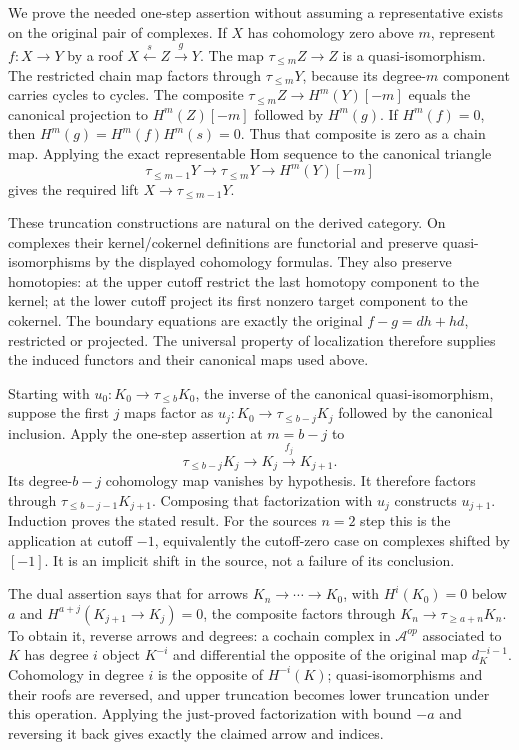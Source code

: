 We prove the needed one-step assertion without assuming a representative exists on the original pair of complexes. If \(X\) has cohomology zero above \(m\),\allowbreak{} represent \(f:X\to Y\) by a roof \(X\xleftarrow{s}Z\xrightarrow{g}Y\). The map \(\tau_{\leq m}Z\to Z\) is a quasi-isomorphism. The restricted chain map factors through \(\tau_{\leq m}Y\),\allowbreak{} because its degree-\(m\) component carries cycles to cycles. The composite \(\tau_{\leq m}Z\to H^m(Y)[-m]\) equals the canonical projection to \(H^m(Z)[-m]\) followed by \(H^m(g)\). If \(H^m(f)=0\),\allowbreak{} then \(H^m(g)=H^m(f)H^m(s)=0\). Thus that composite is zero as a chain map. Applying the exact representable Hom sequence to the canonical triangle \[
\tau_{\leq m-1}Y\to\tau_{\leq m}Y\to H^m(Y)[-m]
\] gives the required lift \(X\to\tau_{\leq m-1}Y\).

These truncation constructions are natural on the derived category. On complexes their kernel/\allowbreak{}cokernel definitions are functorial and preserve quasi-isomorphisms by the displayed cohomology formulas. They also preserve homotopies:\allowbreak{} at the upper cutoff restrict the last homotopy component to the kernel; at the lower cutoff project its first nonzero target component to the cokernel. The boundary equations are exactly the original \(f-g=dh+hd\),\allowbreak{} restricted or projected. The universal property of localization therefore supplies the induced functors and their canonical maps used above.

Starting with \(u_0:K_0\to\tau_{\leq b}K_0\),\allowbreak{} the inverse of the canonical quasi-isomorphism,\allowbreak{} suppose the first \(j\) maps factor as \(u_j:K_0\to\tau_{\leq b-j}K_j\) followed by the canonical inclusion. Apply the one-step assertion at \(m=b-j\) to \[
\tau_{\leq b-j}K_j\longrightarrow K_j\xrightarrow{f_j}K_{j+1}.
\] Its degree-\(b-j\) cohomology map vanishes by hypothesis. It therefore factors through \(\tau_{\leq b-j-1}K_{j+1}\). Composing that factorization with \(u_j\) constructs \(u_{j+1}\). Induction proves the stated result. For the source\textquotesingle s \(n=2\) step this is the application at cutoff \(-1\),\allowbreak{} equivalently the cutoff-zero case on complexes shifted by \([-1]\). It is an implicit shift in the source,\allowbreak{} not a failure of its conclusion.

The dual assertion says that for arrows \(K_n\to\cdots\to K_0\),\allowbreak{} with \(H^i(K_0)=0\) below \(a\) and \(H^{a+j}(K_{j+1}\to K_j)=0\),\allowbreak{} the composite factors through \(K_n\to\tau_{\geq a+n}K_n\). To obtain it,\allowbreak{} reverse arrows and degrees:\allowbreak{} a cochain complex in \(\mathcal A^{op}\) associated to \(K\) has degree \(i\) object \(K^{-i}\) and differential the opposite of the original map \(d_K^{-i-1}\). Cohomology in degree \(i\) is the opposite of \(H^{-i}(K)\); quasi-isomorphisms and their roofs are reversed,\allowbreak{} and upper truncation becomes lower truncation under this operation. Applying the just-proved factorization with bound \(-a\) and reversing it back gives exactly the claimed arrow and indices.

